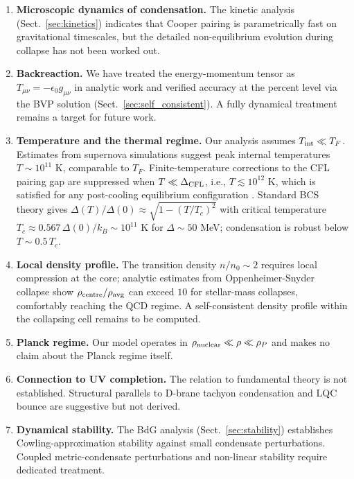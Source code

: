 \documentclass[epj]{svjour}
\begin{document}
\begin{enumerate}
\item \textbf{Microscopic dynamics of condensation.} The kinetic analysis (Sect.~\ref{sec:kinetics}) indicates that Cooper pairing is parametrically fast on gravitational timescales, but the detailed non-equilibrium evolution during collapse has not been worked out.

\item \textbf{Backreaction.} We have treated the energy-momentum tensor as $T_{\mu\nu} = -\epsilon_0 g_{\mu\nu}$ in analytic work and verified accuracy at the percent level via the BVP solution (Sect.~\ref{sec:self_consistent}). A fully dynamical treatment remains a target for future work.

\item \textbf{Temperature and the thermal regime.} Our analysis assumes $T_{\rm int} \ll T_F$. Estimates from supernova simulations \cite{Janka2007} suggest peak internal temperatures $T \sim 10^{11}$ K, comparable to $T_F$. Finite-temperature corrections to the CFL pairing gap are suppressed when $T \ll \Delta_{\rm CFL}$, i.e., $T \lesssim 10^{12}$ K, which is satisfied for any post-cooling equilibrium configuration \cite{Alford2008}. Standard BCS theory gives $\Delta(T)/\Delta(0) \approx \sqrt{1 - (T/T_c)^2}$ with critical temperature $T_c \approx 0.567\,\Delta(0)/k_B \sim 10^{11}$ K for $\Delta \sim 50$ MeV; condensation is robust below $T \sim 0.5\,T_c$.

\item \textbf{Local density profile.} The transition density $n/n_0 \sim 2$ requires local compression at the core; analytic estimates from Oppenheimer-Snyder collapse show $\rho_{\rm centre}/\rho_{\rm avg}$ can exceed $10$ for stellar-mass collapses, comfortably reaching the QCD regime. A self-consistent density profile within the collapsing cell remains to be computed.

\item \textbf{Planck regime.} Our model operates in $\rho_{\rm nuclear} \ll \rho \ll \rho_P$ and makes no claim about the Planck regime itself.

\item \textbf{Connection to UV completion.} The relation to fundamental theory is not established. Structural parallels to D-brane tachyon condensation \cite{Sen2002} and LQC bounce \cite{Bojowald2001,Ashtekar2011} are suggestive but not derived.

\item \textbf{Dynamical stability.} The BdG analysis (Sect.~\ref{sec:stability}) establishes Cowling-approximation stability against small condensate perturbations. Coupled metric-condensate perturbations and non-linear stability require dedicated treatment.



\end{enumerate}
\end{document}
